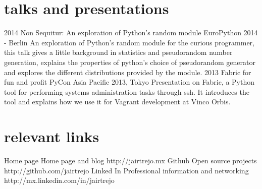 \documentclass[]{friggeri-cv} %
\def\home{{\FA \faHome}}
\def\github{{\FA \faGithub}}
\def\linkedin{{\FA \faLinkedinSign}}
\begin{document}
\begin{entrylist}

\end{entrylist}


\section{talks and presentations}

\begin{entrylist}
\entry
{2014}
{Non Sequitur: An exploration of Python's random module}
{EuroPython 2014 - Berlin}
{An exploration of Python's random module for the curious programmer, this talk gives a little background in statistics and pseudorandom number generation, explains the properties of python's choice of pseudorandom generator and explores the different distributions provided by the module.}
\entry
{2013}
{Fabric for fun and profit}
{PyCon Asia Pacific 2013, Tokyo}
{Presentation on Fabric, a Python tool for performing systems administration tasks through ssh. It introduces the tool and explains how we use it for Vagrant development at Vinco Orbis.}
\end{entrylist}


\section{relevant links}

\begin{entrylist}
\entry
{Home page}
{\home\enspace Home page and blog}
{}
{http://jairtrejo.mx}
\entry
{Github}
{\github\enspace Open source projects}
{}
{http://github.com/jairtrejo}
\entry
{Linked In}
{\linkedin\enspace Professional information and networking}
{}
{http://mx.linkedin.com/in/jairtrejo}
\end{entrylist}
\end{document}
